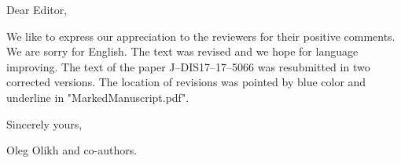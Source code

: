 \documentclass[aip,jap,preprint]{revtex4-1}
\begin{document}
Dear Editor,

\vspace{2cm}
We like to express our appreciation to the reviewers for their positive comments.
We are sorry for English.
The text was revised and we hope for language improving.
The text of the paper J–DIS17–17–5066 was resubmitted in two corrected versions.
The location of revisions was pointed by blue color and underline in "MarkedManuscript.pdf".

\vspace{2cm}
Sincerely yours,

Oleg Olikh and co-authors.
\end{document}
